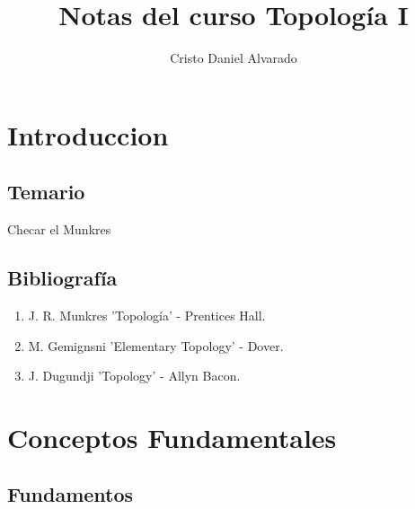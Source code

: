 \documentclass[12pt]{report}
\theoremstyle{largebreak}
\begin{document}
    \setlength{\parskip}{5pt} %
    \setlength{\parindent}{12pt} %
    \title{Notas del curso Topología I}
    \author{Cristo Daniel Alvarado}
    \maketitle

    \tableofcontents %

    \setcounter{chapter}{-1} %
    
    \chapter{Introduccion}
    
    \section{Temario}
    
    Checar el Munkres

    \section{Bibliografía}    

    \begin{enumerate}
        \item J. R. Munkres 'Topología' - Prentices Hall.
        \item M. Gemignsni 'Elementary Topology' -  Dover.
        \item J. Dugundji 'Topology' -  Allyn Bacon.
    \end{enumerate}

    \chapter{Conceptos Fundamentales}

    \section{Fundamentos}
\end{document}
